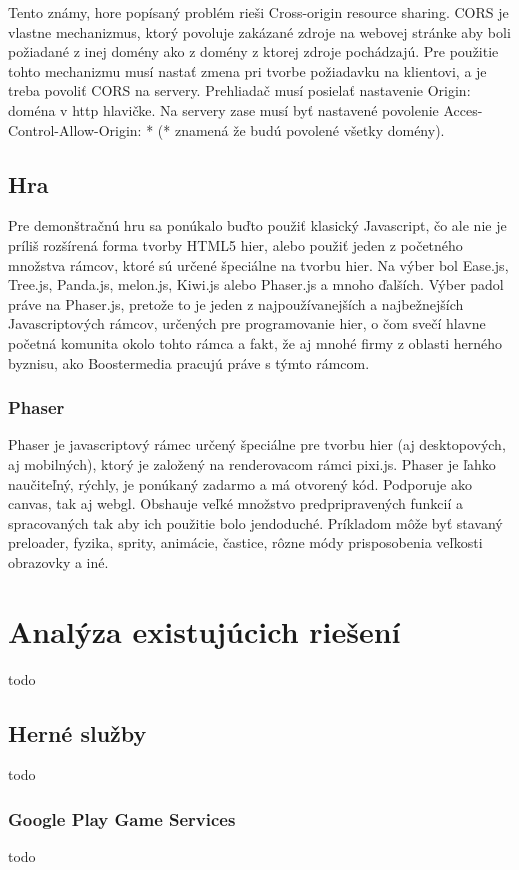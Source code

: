 Tento známy, hore popísaný problém rieši Cross-origin resource sharing. CORS je vlastne mechanizmus, ktorý povoluje zakázané zdroje na webovej stránke aby boli požiadané z inej domény ako z domény z ktorej zdroje pochádzajú. Pre použitie tohto mechanizmu musí nastať zmena pri tvorbe požiadavku na klientovi, a je treba povoliť CORS na servery. Prehliadač musí posielať nastavenie Origin: doména v http hlavičke. Na servery zase musí byť nastavené povolenie Acces-Control-Allow-Origin: * (* znamená že budú povolené všetky domény).

\section{Hra}
Pre demonštračnú hru sa ponúkalo buďto použiť klasický Javascript, čo ale nie je príliš rozšírená forma tvorby HTML5 hier, alebo použiť jeden z početného množstva rámcov, ktoré sú určené špeciálne na tvorbu hier. Na výber bol Ease.js, Tree.js, Panda.js, melon.js, Kiwi.js alebo Phaser.js a mnoho ďalších. Výber padol práve na Phaser.js, pretože to je jeden z najpoužívanejších a najbežnejších Javascriptových rámcov, určených pre programovanie hier, o čom svečí hlavne početná komunita okolo tohto rámca a fakt, že aj mnohé firmy z oblasti herného byznisu, ako Boostermedia pracujú práve s týmto rámcom. 

\subsection{Phaser}
Phaser je javascriptový rámec určený špeciálne pre tvorbu hier (aj desktopových, aj mobilných), ktorý je založený na renderovacom rámci pixi.js. Phaser je ľahko naučiteľný, rýchly, je ponúkaný zadarmo a má otvorený kód. Podporuje ako canvas, tak aj webgl. Obshauje veľké množstvo predpripravených funkcií a spracovaných tak aby ich použitie bolo jendoduché. Príkladom môže byť stavaný preloader, fyzika, sprity, animácie, častice, rôzne módy prisposobenia veľkosti obrazovky a iné. 

\chapter{Analýza existujúcich riešení}
todo

\section{Herné služby}
todo

\subsection{Google Play Game Services}
todo

